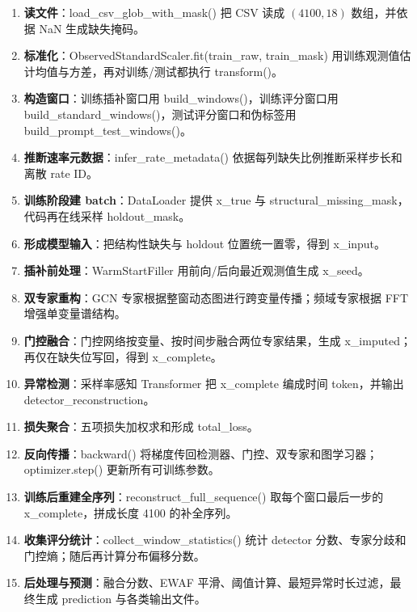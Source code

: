 \documentclass[11pt,a4paper]{ctexart}
\newcommand{\code}[1]{{\ttfamily\small #1}}
\begin{document}
\begin{enumerate}
  \item \textbf{读文件}：\code{load\_csv\_glob\_with\_mask()} 把 CSV 读成 $(4100,18)$ 数组，并依据 NaN 生成缺失掩码。
  \item \textbf{标准化}：\code{ObservedStandardScaler.fit(train\_raw, train\_mask)} 用训练观测值估计均值与方差，再对训练/测试都执行 \code{transform()}。
  \item \textbf{构造窗口}：训练插补窗口用 \code{build\_windows()}，训练评分窗口用 \code{build\_standard\_windows()}，测试评分窗口和伪标签用 \code{build\_prompt\_test\_windows()}。
  \item \textbf{推断速率元数据}：\code{infer\_rate\_metadata()} 依据每列缺失比例推断采样步长和离散 rate ID。
  \item \textbf{训练阶段建 batch}：DataLoader 提供 \code{x\_true} 与 \code{structural\_missing\_mask}，代码再在线采样 \code{holdout\_mask}。
  \item \textbf{形成模型输入}：把结构性缺失与 holdout 位置统一置零，得到 \code{x\_input}。
  \item \textbf{插补前处理}：\code{WarmStartFiller} 用前向/后向最近观测值生成 \code{x\_seed}。
  \item \textbf{双专家重构}：GCN 专家根据整窗动态图进行跨变量传播；频域专家根据 FFT 增强单变量谱结构。
  \item \textbf{门控融合}：门控网络按变量、按时间步融合两位专家结果，生成 \code{x\_imputed}；再仅在缺失位写回，得到 \code{x\_complete}。
  \item \textbf{异常检测}：采样率感知 Transformer 把 \code{x\_complete} 编成时间 token，并输出 \code{detector\_reconstruction}。
  \item \textbf{损失聚合}：五项损失加权求和形成 \code{total\_loss}。
  \item \textbf{反向传播}：\code{backward()} 将梯度传回检测器、门控、双专家和图学习器；\code{optimizer.step()} 更新所有可训练参数。
  \item \textbf{训练后重建全序列}：\code{reconstruct\_full\_sequence()} 取每个窗口最后一步的 \code{x\_complete}，拼成长度 4100 的补全序列。
  \item \textbf{收集评分统计}：\code{collect\_window\_statistics()} 统计 detector 分数、专家分歧和门控熵；随后再计算分布偏移分数。
  \item \textbf{后处理与预测}：融合分数、EWAF 平滑、阈值计算、最短异常时长过滤，最终生成 \code{prediction} 与各类输出文件。
\end{enumerate}
\end{document}
